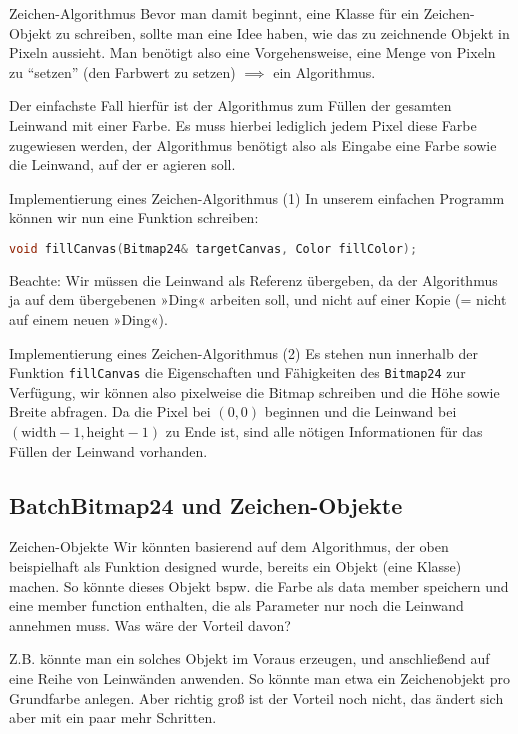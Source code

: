 \begin{frame}{Zeichen-Algorithmus}
	Bevor man damit beginnt, eine Klasse für ein Zeichen-Objekt zu schreiben, sollte man eine Idee haben, wie das zu zeichnende Objekt in Pixeln aussieht. Man benötigt also eine Vorgehensweise, eine Menge von Pixeln zu \enquote{setzen} (den Farbwert zu setzen) $\implies$ ein Algorithmus.
	
	\pause
	\vspace{1em}
	
	Der einfachste Fall hierfür ist der Algorithmus zum Füllen der gesamten Leinwand mit einer Farbe. Es muss hierbei lediglich jedem Pixel diese Farbe zugewiesen werden, der Algorithmus benötigt also als Eingabe eine Farbe sowie die Leinwand, auf der er agieren soll.
\end{frame}

\begin{frame}[fragile]{Implementierung eines Zeichen-Algorithmus (1)}
	In unserem einfachen Programm können wir nun eine Funktion schreiben:
	\begin{lstlisting}[language=C++]
		void fillCanvas(Bitmap24& targetCanvas, Color fillColor);
	\end{lstlisting}
	
	\vspace{1em}
	Beachte: Wir müssen die Leinwand als Referenz übergeben, da der Algorithmus ja auf dem übergebenen »Ding« arbeiten soll, und nicht auf einer Kopie (= nicht auf einem neuen »Ding«).
\end{frame}

\begin{frame}[fragile]{Implementierung eines Zeichen-Algorithmus (2)}
	Es stehen nun innerhalb der Funktion \verb|fillCanvas| die Eigenschaften und Fähigkeiten des \verb|Bitmap24| zur Verfügung, wir können also pixelweise die Bitmap schreiben und die Höhe sowie Breite abfragen. Da die Pixel bei $(0, 0)$ beginnen und die Leinwand bei $(\text{width}-1, \text{height}-1)$ zu Ende ist, sind alle nötigen Informationen für das Füllen der Leinwand vorhanden.
\end{frame}


\subsection{BatchBitmap24 und Zeichen-Objekte}

\begin{frame}{Zeichen-Objekte}
	Wir könnten basierend auf dem Algorithmus, der oben beispielhaft als Funktion designed wurde, bereits ein Objekt (eine Klasse) machen. So könnte dieses Objekt bspw. die Farbe als data member speichern und eine member function enthalten, die als Parameter nur noch die Leinwand annehmen muss. Was wäre der Vorteil davon?
	
	\pause
	\vspace{1em}
	
	Z.B. könnte man ein solches Objekt im Voraus erzeugen, und anschließend auf eine Reihe von Leinwänden anwenden. So könnte man etwa ein Zeichenobjekt pro Grundfarbe anlegen. Aber richtig groß ist der Vorteil noch nicht, das ändert sich aber mit ein paar mehr Schritten.
\end{frame}

